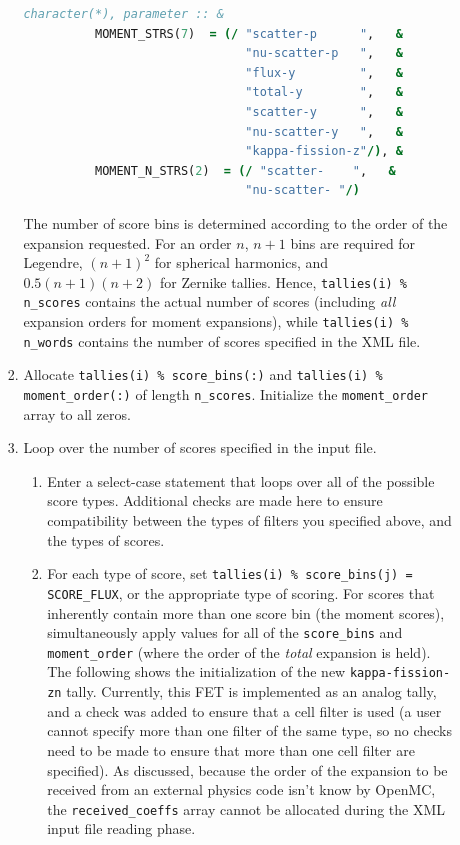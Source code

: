 \documentclass[10pt]{article}
\numberwithin{equation}{section} %
\begin{document}
\begin{enumerate}
\begin{enumerate}
\begin{enumerate}
\begin{lstlisting}[language=Fortran]
		character(*), parameter :: &
          MOMENT_STRS(7)  = (/ "scatter-p      ",   &
                               "nu-scatter-p   ",   &
                               "flux-y         ",   &
                               "total-y        ",   &
                               "scatter-y      ",   &
                               "nu-scatter-y   ",   &
                               "kappa-fission-z"/), &
          MOMENT_N_STRS(2)  = (/ "scatter-    ",   &
                               "nu-scatter- "/)
\end{lstlisting}

The number of score bins is determined according to the order of the expansion requested. For an order \(n\), \(n+1\) bins are required for Legendre, \((n+1)^2\) for spherical harmonics, and \(0.5(n+1)(n+2)\) for Zernike tallies. Hence, {\tt tallies(i) \% n\_scores} contains the actual number of scores (including {\it all} expansion orders for moment expansions), while {\tt tallies(i) \% n\_words} contains the number of scores specified in the XML file.
		\item Allocate {\tt tallies(i) \% score\_bins(:)} and {\tt tallies(i) \% moment\_order(:)} of length {\tt n\_scores}. Initialize the {\tt moment\_order} array to all zeros. 
		\item Loop over the number of scores specified in the input file.
			
			\begin{enumerate}
			\item Enter a select-case statement that loops over all of the possible score types. Additional checks are made here to ensure compatibility between the types of filters you specified above, and the types of scores. 
			\item For each type of score, set {\tt tallies(i) \% score\_bins(j) = SCORE\_FLUX}, or the appropriate type of scoring. For scores that inherently contain more than one score bin (the moment scores), simultaneously apply values for all of the {\tt score\_bins} and {\tt moment\_order} (where the order of the {\it total} expansion is held). The following shows the initialization of the new {\tt kappa-fission-zn} tally. Currently, this FET is implemented as an analog tally, and a check was added to ensure that a cell filter is used (a user cannot specify more than one filter of the same type, so no checks need to be made to ensure that more than one cell filter are specified). As discussed, because the order of the expansion to be received from an external physics code isn't know by OpenMC, the {\tt received\_coeffs} array cannot be allocated during the XML input file reading phase.
					

\end{enumerate}
\end{enumerate}
\end{enumerate}
\end{enumerate}
\end{document}
